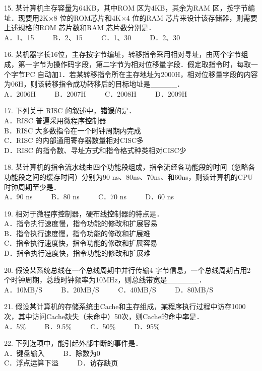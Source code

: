 15. 某计算机主存容量为64KB，其中ROM 区为4KB，其余为RAM 区，按字节编址．现要用2K×8 位的ROM芯片和4K×4 位的RAM 芯片来设计该存储器，则需要上述规格的ROM 芯片数和RAM 芯片数分别是． \\
A．1、15 $\qquad$ B．2、15 $\qquad$ C．1、30 $\qquad$ D．2、30

16. 某机器字长16位，主存按字节编址，转移指令采用相对寻址，由两个字节组成，第一字节为操作码字段，第二字节为相对位移量字段．假定取指令时，每取一个字节PC 自动加1．若某转移指令所在主存地址为2000H，相对位移量字段的内容为06H，则该转移指令成功转移后的目标地址是_____． \\
A．2006H $\qquad$ B．2007H $\qquad$ C．2008H $\qquad$ D．2009H

17. 下列关于 RISC 的叙述中，\textbf{错误}的是． \\
A．RISC 普遍采用微程序控制器 \\
B．RISC 大多数指令在一个时钟周期内完成 \\
C．RISC 的内部通用寄存器数量相对CISC多 \\
D．RISC 的指令数、寻址方式和指令格式种类相对CISC少

18. 某计算机的指令流水线由四个功能段组成，指令流经各功能段的时间（忽略各功能段之间的缓存时间）分别为90 ns、80ns、70ns、和60ns，则该计算机的CPU时钟周期至少是． \\
A．90 ns $\qquad$ B．80 ns $\qquad$ C．70 ns $\qquad$ D．60 ns

19. 相对于微程序控制器，硬布线控制器的特点是． \\
A．指令执行速度慢，指令功能的修改和扩展容易 \\
B．指令执行速度慢，指令功能的修改和扩展难 \\
C．指令执行速度快，指令功能的修改和扩展容易 \\
D．指令执行速度快，指令功能的修改和扩展难

20. 假设某系统总线在一个总线周期中并行传输4 字节信息，一个总线周期占用2 个时钟周期，总线时钟频率为10MHz，则总线带宽是______． \\
A．10MB/S $\qquad$ B．20MB/S $\qquad$ C．40MB/S $\qquad$ D．80MB/S

21. 假设某计算机的存储系统由Cache和主存组成，某程序执行过程中访存1000次，其中访问Cache缺失（未命中）50次，则Cache的命中率是． \\
A．5\% $\qquad$ B．9.5\% $\qquad$ C．50\% $\qquad$ D．95\%

22. 下列选项中，能引起外部中断的事件是． \\
A．键盘输入 $\qquad$ B．除数为0 \\
C．浮点运算下溢  $\qquad$ D．访存缺页

